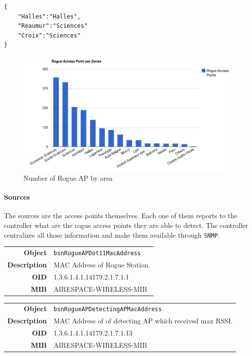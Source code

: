 \begin{lstlisting}[frame=single,breaklines=true,caption={Example of a Zone Dictionary}]
{
	"Halles":"Halles",
	"Reaumur":"Sciences"
	"Croix":"Sciences"	
}
\end{lstlisting}

\begin{figure}[H]
   \includegraphics[width=\textwidth]{Pictures/chapter5/rogue-ap.jpg}
   \caption{Number of Rogue AP by area}
\end{figure}

\paragraph*{Sources} The sources are the access points themselves. Each one of them reports to the controller what are the rogue access points they are able to detect. The controller centralizes all those information and make them available through \texttt{SNMP}.

\begin{tabular}{|r l|}
\hline
\textbf{Object} & \texttt{bsnRogueAPDot11MacAddress} \\
\textbf{Description} & \parbox{11cm}{MAC Address of Rogue Station.} \\
\textbf{OID} & 1.3.6.1.4.1.14179.2.1.7.1.1 \\
\textbf{MIB} & AIRESPACE-WIRELESS-MIB \\
\hline
\end{tabular}

\begin{tabular}{|r l|}
\hline
\textbf{Object} & \texttt{bsnRogueAPDetectingAPMacAddress} \\
\textbf{Description} & \parbox{11cm}{MAC Address of of detecting AP which received max RSSI.} \\
\textbf{OID} & 1.3.6.1.4.1.14179.2.1.7.1.13 \\
\textbf{MIB} & AIRESPACE-WIRELESS-MIB \\
\hline
\end{tabular}



